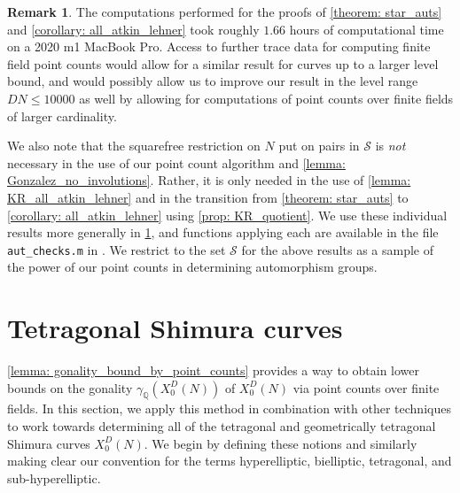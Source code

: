 \documentclass[11pt,reqno]{amsart}
\newcommand{\Q}{\mathbb{Q}}
\theoremstyle{definition}
\newtheorem{remark}[theorem]{Remark}
\begin{document}
\begin{remark}
The computations performed for the proofs of \cref{theorem: star_auts} and \cref{corollary: all_atkin_lehner} took roughly $1.66$ hours of computational time on a 2020 m1 MacBook Pro. Access to further trace data for computing finite field point counts would allow for a similar result for curves up to a larger level bound, and would possibly allow us to improve our result in the level range $DN \leq 10000$ as well by allowing for computations of point counts over finite fields of larger cardinality. 

We also note that the squarefree restriction on $N$ put on pairs in $\mathcal{S}$ is \emph{not} necessary in the use of our point count algorithm and \cref{lemma: Gonzalez_no_involutions}. Rather, it is only needed in the use of \cref{lemma: KR_all_atkin_lehner} and in the transition from \cref{theorem: star_auts} to \cref{corollary: all_atkin_lehner} using \cref{prop: KR_quotient}. We use these individual results more generally in \cref{section: tetragonal}, and functions applying each are available in the file \texttt{aut{\_}checks.m} in \cite{MPSSRep}. We restrict to the set $\mathcal{S}$ for the above results as a sample of the power of our point counts in determining automorphism groups. 
\end{remark}






\section{Tetragonal Shimura curves}\label{section: tetragonal}


\cref{lemma: gonality_bound_by_point_counts} provides a way to obtain lower bounds on the gonality $\gamma_\Q(X_0^D(N))$ of $X_0^D(N)$ via point counts over finite fields. In this section, we apply this method in combination with other techniques to work towards determining all of the tetragonal and geometrically tetragonal Shimura curves $X_0^D(N)$. We begin by defining these notions and similarly making clear our convention for the terms hyperelliptic, bielliptic, tetragonal, and sub-hyperelliptic. 
\end{document}
